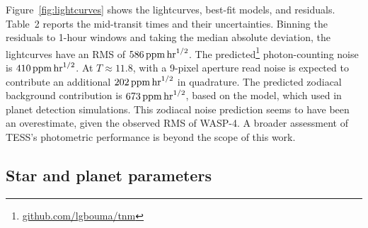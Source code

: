 \documentclass[12pt,twocolumn,tighten]{aastex62}
\begin{document}
Figure~\ref{fig:lightcurves} shows the lightcurves, best-fit models,
and residuals.  Table~2 reports the mid-transit times and their
uncertainties.
Binning the residuals to 1-hour windows and taking the median absolute
deviation, the lightcurves have an RMS of $586\,{\rm ppm}\,{\rm
hr}^{1/2}$.  The predicted\footnote{\url{github.com/lgbouma/tnm}}
photon-counting noise is $410\,{\rm ppm}\,{\rm hr}^{1/2}$.  At
$T\approx11.8$, with a 9-pixel aperture read noise is expected to
contribute an additional $202\,{\rm ppm}\,{\rm hr}^{1/2}$ in
quadrature.  The predicted zodiacal background contribution is
$673\,{\rm ppm}\,{\rm hr}^{1/2}$, based on the
\citet{winn_photonflux_2013} model, which \citet{Sullivan_2015} used
in planet detection simulations.  This zodiacal noise prediction seems
to have been an overestimate, given the observed RMS of WASP-4.  A
broader assessment of TESS's photometric performance is beyond
the scope of this work.


\subsection{Star and planet parameters}
\label{sec:system_parameters}
\end{document}
